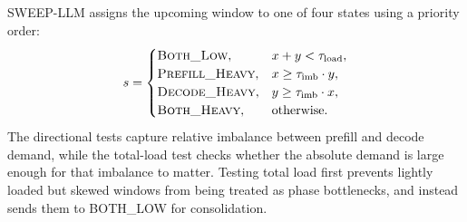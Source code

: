 SWEEP-LLM assigns the upcoming window to one of four states using a priority order:
\begin{equation}
s =
\begin{cases}
\textsc{Both\_Low}, & x+y < \tau_{\mathrm{load}}, \\
\textsc{Prefill\_Heavy}, & x \ge \tau_{\mathrm{imb}} \cdot y, \\
\textsc{Decode\_Heavy}, & y \ge \tau_{\mathrm{imb}} \cdot x, \\
\textsc{Both\_Heavy}, & \text{otherwise}.
\end{cases}
\label{eq:state_classifier}
\end{equation}
The directional tests capture relative imbalance between prefill and decode demand, while the total-load test checks whether the absolute demand is large enough for that imbalance to matter.
Testing total load first prevents lightly loaded but skewed windows from being treated as phase bottlenecks, and instead sends them to BOTH\_LOW for consolidation.
